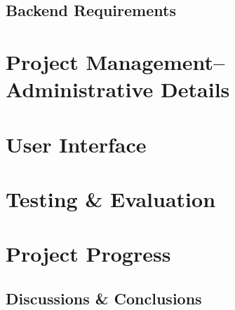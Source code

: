 \documentclass[11pt,letterpaper]{article}
\begin{document}
\subsection{Backend Requirements} %

\section{Project Management--Administrative Details}

\section{User Interface}


\section{Testing \& Evaluation}

\section{Project Progress}

\subsection{Discussions \& Conclusions}
\end{document}
